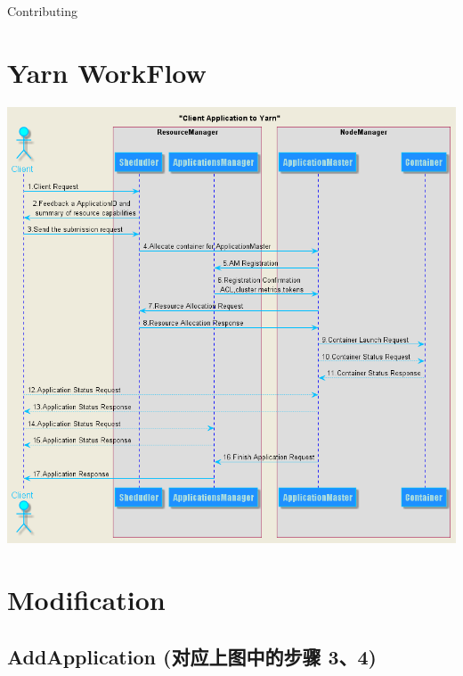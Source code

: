 \documentclass[11pt]{article}
\date{\today}
\title{}
\begin{document}
\tableofcontents

Contributing
\section{Yarn WorkFlow}
\label{sec:org9d21757}
\begin{center}
\includegraphics[width=.9\linewidth]{../images/yarn-workflow-sequenceuml.png}
\end{center}

\section{Modification}
\label{sec:orgc21857b}
\subsection{AddApplication (对应上图中的步骤 3、4)}
\label{sec:org8c46afc}
\end{document}
